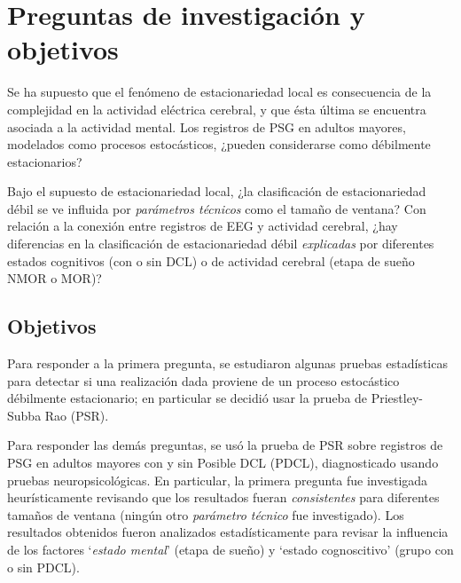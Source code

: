\documentclass[12pt,letterpaper]{book}
\begin{document}

\section*{Preguntas de investigación y objetivos}

Se ha supuesto que el fenómeno de estacionariedad local es consecuencia de la complejidad en la actividad eléctrica cerebral, y que ésta última se encuentra asociada a la actividad mental.
%
Los registros de PSG en adultos mayores, modelados como procesos estocásticos, ¿pueden considerarse como débilmente estacionarios? 

Bajo el supuesto de estacionariedad local, ¿la clasificación de estacionariedad débil se ve influida por \textit{parámetros técnicos} como el tamaño de ventana?
%
Con relación a la conexión entre registros de EEG y actividad cerebral, ¿hay diferencias en la clasificación de estacionariedad débil \textit{explicadas} por diferentes estados cognitivos (con o sin DCL) o de actividad cerebral (etapa de sueño NMOR o MOR)?


\newpage

\subsection*{Objetivos}


Para responder a la primera pregunta, se estudiaron algunas pruebas estadísticas para detectar si una realización dada proviene de un proceso estocástico débilmente estacionario; en particular se decidió usar la prueba de Priestley-Subba Rao (PSR).

Para responder las demás preguntas, se usó la prueba de PSR sobre registros de PSG en adultos mayores con y sin Posible DCL (PDCL), diagnosticado usando pruebas neuropsicológicas.
%
En particular, la primera pregunta fue investigada heurísticamente revisando que los resultados fueran \textit{consistentes} para diferentes tamaños de ventana (ningún otro \textit{parámetro técnico} fue investigado).
%
Los resultados obtenidos fueron analizados estadísticamente para revisar la influencia de los factores `\textit{estado mental}' (etapa de sueño) y `estado cognoscitivo' (grupo con o sin PDCL).
\end{document}

